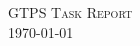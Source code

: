 \documentclass[letterpaper, 12pt]{article}
\begin{document}
\begin{center}
\Large
\textsc{GTPS Task Report}\\
\normalsize \today
\end{center}\vspace{1.5cm}
\end{document}

